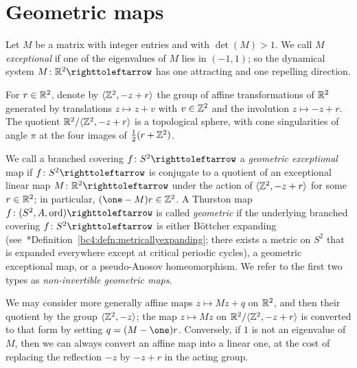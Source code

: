 \documentclass{amsart}
\begin{document}
\section{Geometric maps}
Let $M$ be a matrix with integer entries and with $\det(M)>1$. We call
$M$ \emph{exceptional} if one of the eigenvalues of $M$ lies in
$(-1,1)$; so the dynamical system $M\colon\R^2\selfmap$ has one
attracting and one repelling direction.

For $r\in{\mathbb R}^2$, denote by $\langle {\mathbb Z}^2,-z+r\rangle$ the group of
affine transformations of ${\mathbb R}^2$ generated by translations
$z\mapsto z+v$ with $v\in {\mathbb Z}^2$ and the involution $z\mapsto
-z+r$. The quotient ${\mathbb R}^2/\langle{\mathbb Z}^2,-z+r\rangle$ is a topological
sphere, with cone singularities of angle $\pi$ at the four images of
$\tfrac12(r+{\mathbb Z}^2)$.

We call a branched covering $f\colon S^2\selfmap$ a \emph{geometric
  exceptional} map if $f\colon S^2\selfmap$ is conjugate to a quotient
of an exceptional linear map $M\colon\R^2\selfmap$ under the action of
$\langle {\mathbb Z}^2,-z+r\rangle$ for some $r\in{\mathbb R}^2$; in particular,
$(\one-M)r\in\Z^2$.  A Thurston map $f\colon(S^2,A,\ord)\selfmap$ is
called \emph{geometric} if the underlying branched covering
$f\colon S^2\selfmap$ is either B\"{o}ttcher expanding
(see~\cite{bartholdi-dudko:bc4}*{Definition~\ref{bc4:defn:metricallyexpanding}};
there exists a metric on $S^2$ that is expanded everywhere except at
critical periodic cycles), a geometric exceptional map, or a
pseudo-Anosov homeomorphism.  We refer to the first two types as
\emph{non-invertible geometric maps}.

We may consider more generally affine maps $z\mapsto M z+q$ on ${\mathbb R}^2$,
and then their quotient by the group $\langle {\mathbb Z}^2,-z\rangle$; the map
$z\mapsto M z$ on ${\mathbb R}^2/\langle{\mathbb Z}^2,-z+r\rangle$ is converted to that
form by setting $q=(M-\one)r$. Conversely, if $1$ is not an eigenvalue
of $M$, then we can always convert an affine map into a linear one, at
the cost of replacing the reflection $-z$ by $-z+r$ in the acting
group.
\end{document}
